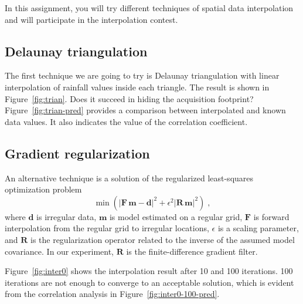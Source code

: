 
In this assignment, you will try different techniques of spatial data
interpolation and will participate in the interpolation contest.

\subsection{Delaunay triangulation}

The first technique we are going to try is Delaunay triangulation with
linear interpolation of rainfall values inside each triangle. The
result is shown in Figure~\ref{fig:trian}. Does it succeed in hiding
the acquisition footprint? Figure~\ref{fig:trian-pred} provides a
comparison between interpolated and known data values. It also
indicates the value of the correlation coefficient.


\subsection{Gradient regularization}

An alternative technique is a solution of the regularized
least-squares optimization problem
\begin{equation}
\label{eq:laplace}
\min\left( |\mathbf{F}\,\mathbf{m} - \mathbf{d}|^2 + \epsilon^2 |\mathbf{R}\,\mathbf{m}|^2\right)\;,
\end{equation}
where $\mathbf{d}$ is irregular data, $\mathbf{m}$ is model estimated
on a regular grid, $\mathbf{F}$ is forward interpolation from the
regular grid to irregular locations, $\epsilon$ is a scaling
parameter, and $\mathbf{R}$ is the regularization operator related to
the inverse of the assumed model covariance. In our experiment,
$\mathbf{R}$ is the finite-difference gradient filter.


Figure~\ref{fig:inter0} shows the interpolation result after 10 and
100 iterations. 100 iterations are not enough to converge to an
acceptable solution, which is evident from the correlation analysis in
Figure~\ref{fig:inter0-100-pred}.

